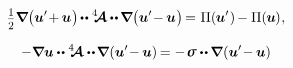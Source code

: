 \begin{equation*}
\smalldisplaystyleonehalf \boldnabla \bigl(
\bm{u}' \hspace{-0.4ex} + \hspace{-0.1ex} \bm{u}
\hspace{.1ex} \bigr) \hspace{-0.2ex}
\dotdotp \stiffnesstensor \hspace{-0.1ex} \dotdotp \hspace{-0.15ex} \boldnabla \bigl(
\bm{u}' \hspace{-0.4ex} - \hspace{-0.1ex} \bm{u}
\hspace{.1ex} \bigr) \hspace{-0.25ex}
= \hspace{.1ex} \potentialenergydensity (\hspace{-0.1ex}\bm{u}'\hspace{.1ex}) \hspace{-0.2ex}
- \potentialenergydensity (\hspace{-0.1ex}\bm{u}\hspace{-0.1ex})
\hspace{.1ex} ,
\end{equation*}

\noindent
{}

\begin{equation*}
- \boldnabla \bm{u}
\dotdotp \stiffnesstensor \dotdotp 
\hspace{-0.25ex} \boldnabla \hspace{.1ex}
( \bm{u}' \hspace{-0.4ex} - \hspace{-0.1ex} \bm{u} ) \hspace{-0.2ex}
= - \hspace{.2ex} \linearstress \dotdotp
\hspace{-0.1ex} \boldnabla
\hspace{.1ex} ( \bm{u}' \hspace{-0.4ex} - \hspace{-0.1ex} \bm{u} )
\end{equation*}

\noindent
{}

